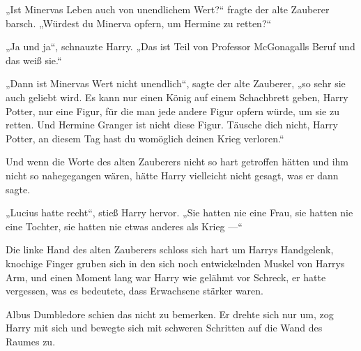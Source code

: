 „Ist Minervas Leben auch von unendlichem Wert?“ fragte der alte Zauberer barsch.
„Würdest du Minerva opfern, um Hermine zu retten?“

„Ja und ja“, schnauzte Harry.
„Das ist Teil von Professor McGonagalls Beruf und das weiß sie.“

„Dann ist Minervas Wert nicht unendlich“, sagte der alte Zauberer, „so sehr sie auch geliebt wird. Es kann nur einen König auf einem Schachbrett geben, Harry Potter, nur eine Figur, für die man jede andere Figur opfern würde, um sie zu retten. Und Hermine Granger ist nicht diese Figur. Täusche dich nicht, Harry Potter, an diesem Tag hast du womöglich deinen Krieg verloren.“

Und wenn die Worte des alten Zauberers nicht so hart getroffen hätten und ihm nicht so nahegegangen wären, hätte Harry vielleicht nicht gesagt, was er dann sagte.

„Lucius hatte recht“, stieß Harry hervor.
„Sie hatten nie eine Frau, sie hatten nie eine Tochter, sie hatten nie etwas anderes als Krieg —“

Die linke Hand des alten Zauberers schloss sich hart um Harrys Handgelenk, knochige Finger gruben sich in den sich noch entwickelnden Muskel von Harrys Arm, und einen Moment lang war Harry wie gelähmt vor Schreck, er hatte vergessen, was es bedeutete, dass Erwachsene stärker waren.

Albus Dumbledore schien das nicht zu bemerken. Er drehte sich nur um, zog Harry mit sich und bewegte sich mit schweren Schritten auf die Wand des Raumes zu.

